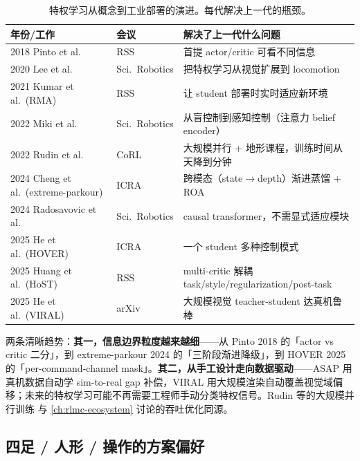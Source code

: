 \begin{table}[H]
\centering
\small
\caption{特权学习从概念到工业部署的演进。每代解决上一代的瓶颈。}
\label{tab:rlmc-priv-timeline}
\begin{tabular}{@{}llp{6.0cm}@{}}
\toprule
年份/工作 & 会议 & 解决了上一代什么问题 \\
\midrule
2018 Pinto et al. & RSS & 首提 actor/critic 可看不同信息 \\
2020 Lee et al. & Sci.\ Robotics & 把特权学习从视觉扩展到 locomotion \\
2021 Kumar et al.\ (RMA) & RSS & 让 student 部署时实时适应新环境 \\
2022 Miki et al. & Sci.\ Robotics & 从盲控制到感知控制（注意力 belief encoder） \\
2022 Rudin et al. & CoRL & 大规模并行 + 地形课程，训练时间从天降到分钟 \\
2024 Cheng et al.\ (extreme-parkour) & ICRA & 跨模态（state$\to$depth）渐进蒸馏 + ROA \\
2024 Radosavovic et al. & Sci.\ Robotics & causal transformer，不需显式适应模块 \\
2025 He et al.\ (HOVER) & ICRA & 一个 student 多种控制模式 \\
2025 Huang et al.\ (HoST) & RSS & multi-critic 解耦 task/style/regularization/post-task \\
2025 He et al.\ (VIRAL) & arXiv & 大规模视觉 teacher-student 达真机鲁棒 \\
\bottomrule
\end{tabular}
\end{table}

两条清晰趋势：\textbf{其一，信息边界粒度越来越细}——从 Pinto 2018 的「actor vs critic 二分」，到 extreme-parkour 2024 的「三阶段渐进降级」，到 HOVER 2025 的「per-command-channel mask」。\textbf{其二，从手工设计走向数据驱动}——ASAP \cite{he2025asap} 用真机数据自动学 sim-to-real gap 补偿，VIRAL 用大规模渲染自动覆盖视觉域偏移；未来的特权学习可能不再需要工程师手动分类特权信号。Rudin 等的大规模并行训练 \cite{rudin2021minutes} 与 \cref{ch:rlmc-ecosystem} 讨论的吞吐优化同源。

\subsection{四足 / 人形 / 操作的方案偏好}
\label{sec:rlmc-priv-byrobot}

